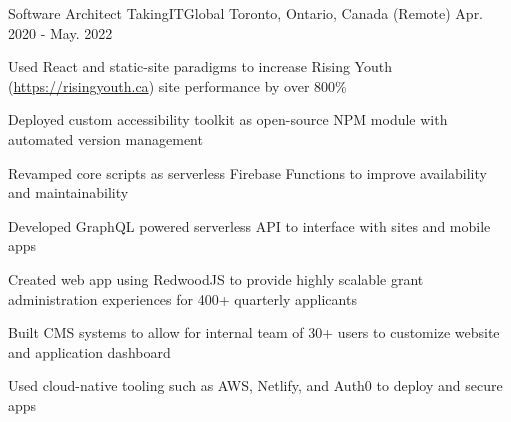 

\begin{cventries}

  \cventry
    {Software Architect} %
    {TakingITGlobal} %
    {Toronto, Ontario, Canada (Remote)} %
    {Apr. 2020 - May. 2022} %
    {
      \begin{cvitems} %
        \item {Used React and static-site paradigms to increase Rising Youth (\url{https://risingyouth.ca}) site performance by over 800\%}
        \item {Deployed custom accessibility toolkit as open-source NPM module with automated version management}
        \item {Revamped core scripts as serverless Firebase Functions to improve availability and maintainability}
        \item {Developed GraphQL powered serverless API to interface with sites and mobile apps}
        \item {Created web app using RedwoodJS to provide highly scalable grant administration experiences for 400+ quarterly applicants}
        \item {Built CMS systems to allow for internal team of 30+ users to customize website and application dashboard}
        \item {Used cloud-native tooling such as AWS, Netlify, and Auth0 to deploy and secure apps}
      \end{cvitems}
    }




\end{cventries}
